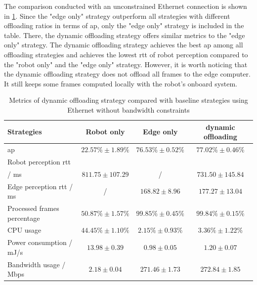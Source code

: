 The comparison conducted with an unconstrained Ethernet connection is shown in \cref{tab:dynamic_eth_320}. Since the "edge only" strategy outperform all strategies with different offloading ratios in terms of \gls{ap}, only the "edge only" strategy is included in the table. There, the dynamic offloading strategy offers similar metrics to the "edge only" strategy. The dynamic offloading strategy achieves the best \gls{ap} among all offloading strategies and achieves the lowest \gls{rtt} of robot perception compared to the "robot only" and the "edge only" strategy. However, it is worth noticing that the dynamic offloading strategy does not offload all frames to the edge computer. It still keeps some frames computed locally with the robot's onboard system. 

\begin{table}[htb]%
    \centering%
    \footnotesize
    \begin{tabular}{l|cc|c}
        \toprule
        Strategies &                        Robot only &            Edge only &              dynamic offloading  \\
        \midrule
        \gls{ap} &                          $22.57\%\pm1.89\%$ &    $76.53\%\pm0.52\%$ &     \textbf{$77.02\%\pm0.46\%$}  \\
        Robot perception \gls{rtt}\\ / ms &   $811.75\pm 107.29$ &     / &                      \textbf{$731.50\pm145.84$}   \\
        Edge perception \gls{rtt} / ms &    / &                     \textbf{$168.82\pm8.96$} &        $177.27\pm13.04$    \\
        Processed frames percentage &       $50.87\%\pm1.57\%$ &    \textbf{$99.85\%\pm0.45\%$} &     $99.84\%\pm0.15\%$  \\
        \midrule
        CPU usage &                         $44.45\% \pm 1.10\%$ &  \textbf{$2.15\% \pm 0.93\%$} &    $3.36\% \pm 1.22\%$ \\
        Power consumption / mJ/s &      $13.98 \pm 0.39$ &      \textbf{$0.98 \pm 0.05$} &        $1.20 \pm 0.07$     \\
        Bandwidth usage / Mbps &            \textbf{$2.18 \pm 0.04$} &       $271.46 \pm 1.73$ &      $272.84 \pm 1.85$   \\
        \bottomrule
    \end{tabular}
    \caption{Metrics of dynamic offloading strategy compared with baseline strategies using Ethernet without bandwidth constraints}
    \label{tab:dynamic_eth_320}%
\end{table}

